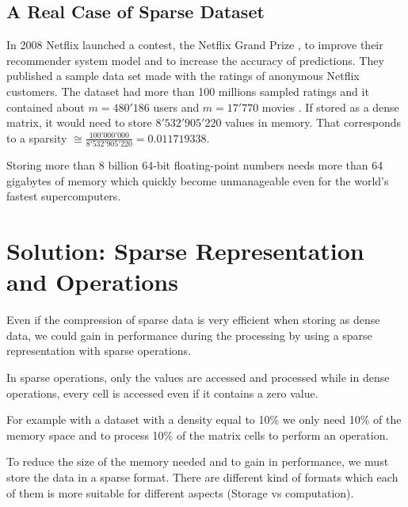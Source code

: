 \subsection{A Real Case of Sparse Dataset}
In 2008 Netflix launched a contest, the Netflix Grand Prize \cite{netflixgrandprize}, to improve their recommender system model and to increase the accuracy of predictions. They published a sample data set made with the ratings of anonymous Netflix customers. The dataset had more than 100 millions sampled ratings and it contained about $m=480'186$ users and $m=17'770$ movies \cite{Koren091the}. If stored as a dense matrix, it would need to store $8'532'905'220$ values in memory. That corresponds to a sparsity $\cong \frac{100'000'000}{8'532'905'220} = 0.011719338$.

Storing more than 8 billion 64-bit floating-point numbers needs more than 64 gigabytes of memory which quickly become unmanageable even for the world's fastest supercomputers. 

\section{Solution: Sparse Representation and Operations}
Even if the compression of sparse data is very efficient when storing as dense data, we could gain in performance during the processing by using a sparse representation with sparse operations. 

In sparse operations, only the values are accessed and processed while in dense operations, every cell is accessed even if it contains a zero value.

For example with a dataset with a density equal to 10\% we only need 10\% of the memory space and to process 10\% of the matrix cells to perform an operation.

To reduce the size of the memory needed and to gain in performance, we must store the data in a sparse format. There are different kind of formats which each of them is more suitable for different aspects (Storage vs computation).




